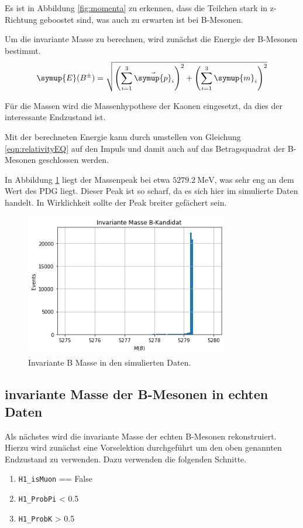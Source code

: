 Es ist in Abbildung \ref{fig:momenta} zu erkennen, dass die Teilchen stark in z-Richtung geboostet sind, was auch zu erwarten ist bei B-Mesonen.

Um die invariante Masse zu berechnen, wird zun\"achst die Energie der B-Mesonen bestimmt.
\begin{equation}
  \symup{E}(B^{\pm}) =
  \sqrt{\left(\sum_{i = 1}^{3} \vec{\symup{p}}_i\right)^2 + \left(\sum_{i = 1}^{3} \symup{m}_i\right)^2}
\end{equation}

F\"ur die Massen wird die Massenhypothese der Kaonen eingesetzt, da dies der interessante Endzustand ist.

Mit der berechneten Energie kann durch umstellen von Gleichung \eqref{eqn:relativityEQ} auf den Impuls und damit auch auf das Betragsquadrat der B-Mesonen geschlossen werden.

In Abbildung \ref{fig:invMassB} liegt der Massenpeak bei etwa $\SI{5279.2}{\mega\electronvolt}$, was sehr eng an dem Wert des PDG liegt.
Dieser Peak ist so scharf, da es sich hier im simulierte Daten handelt. In Wirklichkeit sollte der Peak breiter gefächert sein.

\begin{figure}[!htb]
  \centering
  \includegraphics[width=0.8\textwidth]{plots/sim_inv_masse_B.png}
  \caption{Invariante B Masse in den simulierten Daten.}
  \label{fig:invMassB}
\end{figure}

\subsection{invariante Masse der B-Mesonen in echten Daten}
Als n\"achstes wird die invariante Masse der echten B-Mesonen rekonstruiert.
Hierzu wird zun\"achst eine Vorselektion durchgef\"uhrt um den oben genannten Endzustand zu verwenden.
Dazu verwenden die folgenden Schnitte.
\begin{enumerate}
  \item \texttt{H1\_isMuon} == False
  \item \texttt{H1\_ProbPi} < 0.5
  \item \texttt{H1\_ProbK} > 0.5
\end{enumerate}

